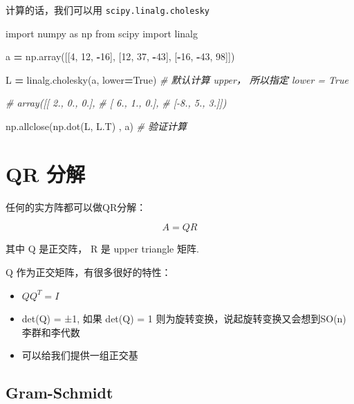 \documentclass[
]{book}
\newenvironment{Shaded}{\begin{snugshade}}{\end{snugshade}}
\newcommand{\CommentTok}[1]{\textcolor[rgb]{0.56,0.35,0.01}{\textit{#1}}}
\newcommand{\DecValTok}[1]{\textcolor[rgb]{0.00,0.00,0.81}{#1}}
\newcommand{\ImportTok}[1]{#1}
\newcommand{\NormalTok}[1]{#1}
\newcommand{\OperatorTok}[1]{\textcolor[rgb]{0.81,0.36,0.00}{\textbf{#1}}}
\newcommand{\VariableTok}[1]{\textcolor[rgb]{0.00,0.00,0.00}{#1}}
\providecommand{\tightlist}{%
  \setlength{\itemsep}{0pt}\setlength{\parskip}{0pt}}
\begin{document}
计算的话，我们可以用 \texttt{scipy.linalg.cholesky}

\begin{Shaded}
\begin{Highlighting}[]
\ImportTok{import}\NormalTok{ numpy }\ImportTok{as}\NormalTok{ np}
\ImportTok{from}\NormalTok{ scipy }\ImportTok{import}\NormalTok{ linalg}

\NormalTok{a }\OperatorTok{=}\NormalTok{ np.array([[}\DecValTok{4}\NormalTok{, }\DecValTok{12}\NormalTok{, }\OperatorTok{{-}}\DecValTok{16}\NormalTok{],}
\NormalTok{              [}\DecValTok{12}\NormalTok{, }\DecValTok{37}\NormalTok{, }\OperatorTok{{-}}\DecValTok{43}\NormalTok{],}
\NormalTok{              [}\OperatorTok{{-}}\DecValTok{16}\NormalTok{, }\OperatorTok{{-}}\DecValTok{43}\NormalTok{, }\DecValTok{98}\NormalTok{]])}
              
\NormalTok{L }\OperatorTok{=}\NormalTok{ linalg.cholesky(a, lower}\OperatorTok{=}\VariableTok{True}\NormalTok{) }\CommentTok{\# 默认计算 upper， 所以指定 lower = True}

\CommentTok{\# array([[ 2.,  0.,  0.],}
\CommentTok{\#       [ 6.,  1.,  0.],}
\CommentTok{\#       [{-}8.,  5.,  3.]])}

\NormalTok{np.allclose(np.dot(L, L.T) , a) }\CommentTok{\# 验证计算}
\end{Highlighting}
\end{Shaded}

\hypertarget{qr-ux5206ux89e3}{%
\chapter{QR 分解}\label{qr-ux5206ux89e3}}

任何的实方阵都可以做QR分解：

\[A = QR\]

其中 Q 是正交阵， R 是 upper triangle 矩阵.

Q 作为正交矩阵，有很多很好的特性：

\begin{itemize}
\tightlist
\item
  \(QQ^T = I\)
\item
  det(Q) = ±1, 如果 det(Q) = 1 则为旋转变换，说起旋转变换又会想到SO(n) 李群和李代数
\item
  可以给我们提供一组正交基
\end{itemize}

\hypertarget{gram-schmidt}{%
\section{Gram-Schmidt}\label{gram-schmidt}}
\end{document}
